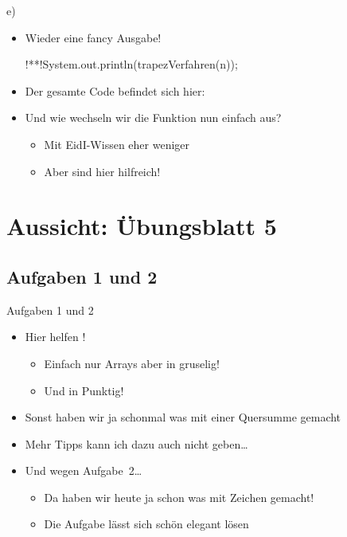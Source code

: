 \begin{frame}[fragile]{e)~}
\begin{itemize}[<+(1)->]
    \itemsep10pt
    \item Wieder eine fancy Ausgabe!
\begin{plainjava}[aboveskip=0pt]
!**!System.out.println(trapezVerfahren(n));
\end{plainjava}
    \item<4-> Der gesamte Code befindet sich hier:~
    \iffull
    \item<5-> Und wie wechseln wir die Funktion nun einfach aus? \begin{itemize}
        \item<6-> Mit EidI-Wissen eher weniger
        \item<7-> Aber  sind hier hilfreich!
    \end{itemize}
    \fi
\end{itemize}
\end{frame}

\iffull
{}
\section{Aussicht: Übungsblatt 5}
\subsection{Aufgaben 1 und 2}
\begin{frame}{Aufgaben 1 und 2}
\begin{itemize}[<+(1)->]
    \itemsep9pt
    \item Hier helfen ! \begin{itemize}
        \item Einfach nur Arrays aber in gruselig!
        \item Und in Punktig! 
    \end{itemize}
    \item Sonst haben wir ja schonmal was mit einer Quersumme gemacht 
    \item Mehr Tipps kann ich dazu auch nicht geben\ldots
    \item Und wegen Aufgabe~2\ldots \begin{itemize}
        \item Da haben wir heute ja schon was mit Zeichen gemacht!
        \item Die Aufgabe lässt sich schön elegant lösen
    \end{itemize}
\end{itemize}
\end{frame}


